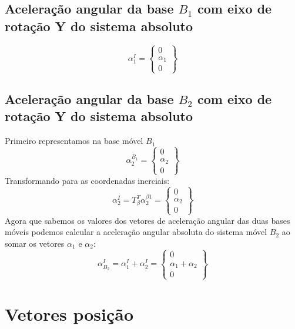 \documentclass[a4paper, 12pt]{article}
\begin{document}
	\subsection{Aceleração angular da base $B_1$ com eixo de rotação Y do sistema absoluto}
	\begin{equation}
		\alpha^I_1 = 
		\begin{Bmatrix}
			0\\ \alpha_1\\0\
		\end{Bmatrix}
	\end{equation}
	
	\subsection{Aceleração angular da base $B_2$ com eixo de rotação Y do sistema absoluto}
	Primeiro representamos na base móvel $B_1$
	\begin{equation}
		\alpha^{B_1}_2 = 
		\begin{Bmatrix}
			0\\ \alpha_2 \\0
		\end{Bmatrix}
	\end{equation}
	Transformando para as coordenadas inerciais:
	\begin{equation}
		\alpha^I_2 = T^T_\beta \alpha^{\beta 1}_2 = \begin{Bmatrix}
			0\\
			\alpha_2\\
			0
		\end{Bmatrix}
	\end{equation}
	Agora que sabemos os valores dos vetores de aceleração angular das duas bases móveis podemos calcular a aceleração angular absoluta do sistema móvel $B_2$ ao somar os vetores $\alpha_1$ e $\alpha_2$:
		\begin{equation}
			\alpha^I_{B_2} = \alpha_1^I + \alpha_2^I = \begin{Bmatrix}
			0\\
			\alpha_1 + \alpha_2\\
			0
		\end{Bmatrix}
		\end{equation}
		

\section{Vetores posição}
\end{document}
